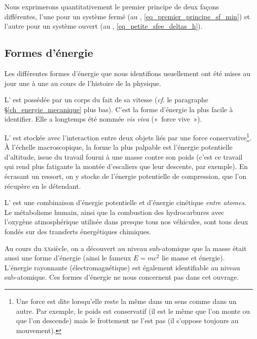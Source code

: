 		Nous exprimerons quantitativement le premier principe de deux façons différentes, l’une pour un système fermé (au \coursdeuxshort, \cref{eq_premier_principe_sf_min}) et l’autre pour un système ouvert (au \courstroisshort, \cref{eq_petite_sfee_deltas_h}).
	
	
	\subsection{Formes d’énergie}
	
		Les différentes formes d’énergie que nous identifions usuellement ont été mises au jour une à une au cours de l’histoire de la physique.
		
		L’ est possédée par un corps du fait de sa vitesse (\textit{cf.} le paragraphe \S\ref{ch_energie_mecanique} plus bas). C’est la forme d’énergie la plus facile à identifier. Elle a longtemps été nommée \textit{vis viva} («~force vive~»).
		
		L’ est stockée avec l’interaction entre deux objets liés par une force conservative\footnote{Une force est dite  lorsqu’elle reste la même dans un sens comme dans un autre. Par exemple, le poids est conservatif (il est le même que l’on monte ou que l’on descende) mais le frottement ne l’est pas (il s’oppose toujours au mouvement).}. À l’échelle macroscopique, la forme la plus palpable est l’énergie potentielle d’altitude, issue du travail fourni à une masse contre son poids (c’est ce travail qui rend plus fatigante la montée d’escaliers que leur descente, par exemple). En écrasant un ressort, on y stocke de l’énergie potentielle de compression, que l’on récupère en le détendant.

		L’ est une combinaison d’énergie potentielle et d’énergie cinétique \emph{entre atomes}. Le métabolisme humain, ainsi que la combustion des hydrocarbures avec l’oxygène atmosphérique utilisée dans presque tous nos véhicules, sont tous deux fondés sur des transferts énergétiques chimiques.
		
		Au cours du \textsc{xx}\ieme siècle, on a découvert au niveau sub-atomique que la masse était aussi une forme d’énergie (ainsi le fameux $E = m c^2$ lie masse et énergie). L’énergie rayonnante (électromagnétique) est également identifiable au niveau sub-atomique. Ces formes d’énergie ne nous concernent pas dans cet ouvrage.

